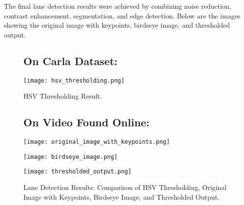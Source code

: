 \documentclass[12pt,a4paper]{article}
\begin{document}
The final lane detection results were achieved by combining noise reduction, contrast enhancement, segmentation, and edge detection. Below are the images showing the original image with keypoints, birdseye image, and thresholded output.

\begin{figure}[h!]
    \subsection*{On Carla Dataset:}

    \texttt{[image: hsv\_thresholding.png]}
    \caption{HSV Thresholding Result.}
    \label{fig:hsv_thresholding}
\end{figure}

\begin{figure}[h!]
    \subsection*{On Video Found Online:}
    \centering
    \texttt{[image: original\_image\_with\_keypoints.png]}
    
    \vspace{0.5em} %
    
    \begin{minipage}{0.40\textwidth}
        \centering
        \texttt{[image: birdseye\_image.png]}
    \end{minipage}%
    \hspace{0.5em} %
    \begin{minipage}{0.40\textwidth}
        \centering
        \texttt{[image: thresholded\_output.png]}
    \end{minipage}

    \vspace{0.5em} %

    \caption{Lane Detection Results: Comparison of HSV Thresholding, Original Image with Keypoints, Birdseye Image, and Thresholded Output.}
    \label{fig:lane_detection}
\end{figure}



\newpage %
\end{document}
